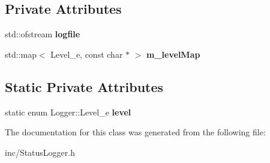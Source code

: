 \subsection*{Private Attributes}
\begin{DoxyCompactItemize}
\item 
\mbox{\label{classStatusLogger_a166f1d6b8016d9c203dd98f16cc488fc}} 
std\+::ofstream {\bfseries logfile}
\item 
\mbox{\label{classLogger_a5e3acb7eae07a5cee57d28711ce45413}} 
std\+::map$<$ Level\+\_\+e, const char $\ast$ $>$ {\bfseries m\+\_\+level\+Map}
\end{DoxyCompactItemize}
\subsection*{Static Private Attributes}
\begin{DoxyCompactItemize}
\item 
\mbox{\label{classLogger_ade70cee1c967259b5dc2448424c7df68}} 
static enum Logger\+::\+Level\+\_\+e {\bfseries level}
\end{DoxyCompactItemize}


The documentation for this class was generated from the following file\+:\begin{DoxyCompactItemize}
\item 
inc/Status\+Logger.\+h\end{DoxyCompactItemize}
